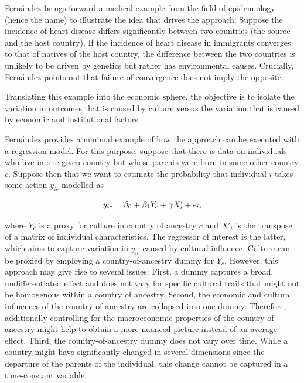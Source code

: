 \documentclass[a4paper, oneside, hyperfootnotes = false]{article}
\begin{document}
{Fernández brings forward a medical example from the field of epidemiology (hence the name) to illustrate the idea that drives the approach:
Suppose the incidence of heart disease differs significantly between two countries (the source and the host country).
If the incidence of heart disease in immigrants converges to that of natives of the host country, the difference between the two countries is unlikely to be driven by genetics but rather has environmental causes.
Crucially, Fernández points out that failure of convergence does not imply the opposite.

Translating this example into the economic sphere, the objective is to isolate the variation in outcomes that is caused by culture versus the variation that is caused by economic and institutional factors.

Fernández provides a minimal example of how the approach can be executed with a regression model.
For this purpose, suppose that there is data on individuals who live in one given country but whose parents were born in some other country $c$.
Suppose then that we want to estimate the probability that individual $i$ takes some action $y_{ic}$ modelled as

\vspace{-8mm}

\begin{equation}
	\label{eq:fernandezexercise}
	y_{ic} = \beta_{0} + \beta_{1}Y_{c} + \gamma{}X'_{i} + \epsilon_{i}\textnormal{,}
\end{equation}

\noindent where $Y_{c}$ is a proxy for culture in country of ancestry $c$ and $X'_{i}$ is the transpose of a matrix of individual characteristics.
The regressor of interest is the latter, which aims to capture variation in $y_{ic}$ caused by cultural influence.
Culture can be proxied by employing a country-of-ancestry dummy for $Y_{c}$.
However, this approach may give rise to several issues:
First, a dummy captures a broad, undifferentiated effect and does not vary for specific cultural traits that might not be homogenous within a country of ancestry.
Second, the economic and cultural influences of the country of ancestry are collapsed into one dummy.
Therefore, additionally controlling for the macroeconomic properties of the country of ancestry might help to obtain a more nuanced picture instead of an average effect.
Third, the country-of-ancestry dummy does not vary over time.
While a country might have significantly changed in several dimensions since the departure of the parents of the individual, this change cannot be captured in a time-constant variable.

}
\end{document}

